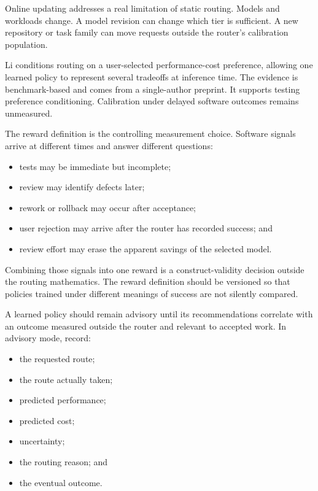 Online updating addresses a real limitation of static routing. Models and workloads change. A model revision can change which tier is sufficient. A new repository or task family can move requests outside the router's calibration population.

Li conditions routing on a user-selected performance-cost preference, allowing one learned policy to represent several tradeoffs at inference time. The evidence is benchmark-based and comes from a single-author preprint. It supports testing preference conditioning. Calibration under delayed software outcomes remains unmeasured.


The reward definition is the controlling measurement choice. Software signals arrive at different times and answer different questions:

\begin{itemize}
\tightlist
\item
  tests may be immediate but incomplete;
\item
  review may identify defects later;
\item
  rework or rollback may occur after acceptance;
\item
  user rejection may arrive after the router has recorded success; and
\item
  review effort may erase the apparent savings of the selected model.
\end{itemize}

Combining those signals into one reward is a construct-validity decision outside the routing mathematics. The reward definition should be versioned so that policies trained under different meanings of success are not silently compared.


A learned policy should remain advisory until its recommendations correlate with an outcome measured outside the router and relevant to accepted work. In advisory mode, record:

\begin{itemize}
\tightlist
\item
  the requested route;
\item
  the route actually taken;
\item
  predicted performance;
\item
  predicted cost;
\item
  uncertainty;
\item
  the routing reason; and
\item
  the eventual outcome.
\end{itemize}

